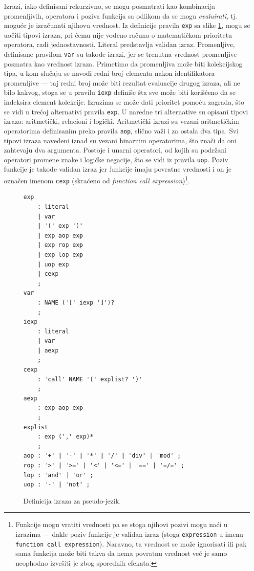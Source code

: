 Izrazi, iako definisani rekurzivno, se mogu posmatrati kao kombinacija promenljivih, operatora i poziva funkcija sa odlikom da se mogu \emph{evaluirati}, tj. moguće je izračunati njihovu vrednost. Iz definicije pravila \texttt{exp} sa slike \ref{fig:PseudoDef6}, mogu se uočiti tipovi izraza, pri čemu nije vođeno računa o matematičkom prioritetu operatora, radi jednostavnosti. Literal predstavlja validan izraz. Promenljive, definisane pravilom \texttt{var} su takođe izrazi, jer se trenutna vrednost promenljive posmatra kao vrednost izraza. Primetimo da promenljiva može biti kolekcijskog tipa, u kom slučaju se navodi redni broj elementa nakon identifikatora promenljive --- taj redni broj može biti rezultat evaluacije drugog izraza, ali ne bilo kakvog, stoga se u pravilu \texttt{iexp} definiše šta sve može biti korišćeno da se indeksira element kolekcije. Izrazima se može dati prioritet pomoću zagrada, što se vidi u trećoj alternativi pravila \texttt{exp}. U naredne tri alternative su opisani tipovi izraza: aritmetički, relacioni i logički. Aritmetički izrazi su vezani aritmetičkim operatorima definisanim preko pravila \texttt{aop}, slično važi i za ostala dva tipa. Svi tipovi izraza navedeni iznad su vezani binarnim operatorima, što znači da oni zahtevaju dva argumenta. Postoje i unarni operatori, od kojih su podržani operatori promene znake i logičke negacije, što se vidi iz pravila \texttt{uop}. Poziv funkcije je takođe validan izraz jer funkcije imaju povratne vrednosti i on je označen imenom \texttt{cexp} (skraćeno od \emph{function call expression})\footnote{Funkcije mogu vratiti vrednosti pa se stoga njihovi pozivi mogu naći u izrazima --- dakle poziv funkcije je validan izraz (stoga \texttt{expression} u imenu \texttt{function call expression}). Naravno, ta vrednost se može ignorisati ili pak sama funkcija može biti takva da nema povratnu vrednost već je samo neophodno izvršiti je zbog sporednih efekata.}.

\begin{figure}[h!]
\begin{lstlisting}[language={}]
exp
    : literal 
    | var
    | '(' exp ')'
    | exp aop exp
    | exp rop exp
    | exp lop exp
    | uop exp
    | cexp
    ;
var 
    : NAME ('[' iexp ']')?
    ;
iexp 
    : literal
    | var
    | aexp
    ;
cexp
    : 'call' NAME '(' explist? ')'
    ;
aexp
	: exp aop exp
	;
explist
    : exp (',' exp)*
    ;
aop : '+' | '-' | '*' | '/' | 'div' | 'mod' ;
rop : '>' | '>=' | '<' | '<=' | '==' | '=/=' ;
lop : 'and' | 'or' ;
uop : '-' | 'not' ;
\end{lstlisting}
\caption{Definicija izraza za pseudo-jezik.}
\label{fig:PseudoDef6}
\end{figure}

